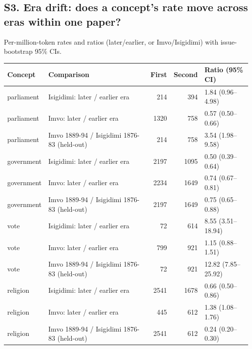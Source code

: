 \subsection*{S3. Era drift: does a concept's rate move across eras within one paper?}
Per-million-token rates and ratios (later/earlier, or Imvo/Isigidimi) with issue-bootstrap 95\% CIs.\\[2pt]
\begin{tabular}{@{}llrrl@{}}
\toprule
Concept & Comparison & First & Second & Ratio (95\% CI) \\ \midrule
parliament & Isigidimi: later / earlier era & 214 & 394 & 1.84 (0.96--4.98) \\
parliament & Imvo: later / earlier era & 1320 & 758 & 0.57 (0.50--0.66) \\
parliament & Imvo 1889-94 / Isigidimi 1876-83 (held-out) & 214 & 758 & 3.54 (1.98--9.58) \\
government & Isigidimi: later / earlier era & 2197 & 1095 & 0.50 (0.39--0.64) \\
government & Imvo: later / earlier era & 2234 & 1649 & 0.74 (0.67--0.81) \\
government & Imvo 1889-94 / Isigidimi 1876-83 (held-out) & 2197 & 1649 & 0.75 (0.65--0.88) \\
vote & Isigidimi: later / earlier era & 72 & 614 & 8.55 (3.51--18.94) \\
vote & Imvo: later / earlier era & 799 & 921 & 1.15 (0.88--1.51) \\
vote & Imvo 1889-94 / Isigidimi 1876-83 (held-out) & 72 & 921 & 12.82 (7.85--25.92) \\
religion & Isigidimi: later / earlier era & 2541 & 1678 & 0.66 (0.50--0.86) \\
religion & Imvo: later / earlier era & 445 & 612 & 1.38 (1.08--1.76) \\
religion & Imvo 1889-94 / Isigidimi 1876-83 (held-out) & 2541 & 612 & 0.24 (0.20--0.30) \\
\bottomrule
\end{tabular}

